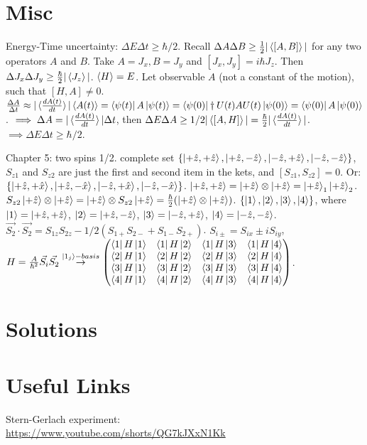 \documentclass{article}
\begin{document}
\section{Misc}
Energy-Time uncertainty:
$\Delta E \Delta t \geq \hbar/2$. Recall $\Delta A \Delta B \geq \frac{1}{2}|\braket{[A,B]}|$ for any two operators $A$ and $B$. Take $A = J_x, B = J_y$ and $[J_x,J_y] = i\hbar J_z$. Then $\Delta J_x \Delta J_y \ge \frac{\hbar}{2}|\braket{J_z}|$. $\braket{H} = E$. Let observable $A$ (not a constant of the motion), such that $[H,A] \neq 0$.
$\frac{\Delta A}{\Delta t} \approx |\braket{\frac{dA(t)}{dt}}|\braket{A(t)} = \bra{\psi(t)}A\ket{\psi(t)} = \bra{\psi(0)}\dagger{U(t)}AU(t)\ket{\psi(0)} = \bra{\psi(0)}A\ket{\psi(0)}$. $\implies \Delta A = |\braket{\frac{dA(t)}{dt}}|\Delta t$, then $\Delta E \Delta A \geq 1/2 |\braket{[A,H]}| = \frac{\hbar}{2}|\braket{\frac{dA(t)}{dt}}|$. $\implies \Delta E \Delta t \geq \hbar/2$.

Chapter 5: two spins 1/2.
complete set $\{\ket{+\hat{z},+\hat{z}}, \ket{+\hat{z},-\hat{z}}, \ket{-\hat{z},+\hat{z}}, \ket{-\hat{z},-\hat{z}}\}$, $S_{z1}$ and $S_{z2}$ are just the first and second item in the kets, and $[S_{z1}, S_{z2}] = 0$. Or: $\{\ket{+\hat{z},+\hat{x}}, \ket{+\hat{z},-\hat{x}}, \ket{-\hat{z},+\hat{x}}, \ket{-\hat{z},-\hat{x}}\}$.
$\ket{+\hat{z},+\hat{z}} = \ket{+\hat{z}} \otimes \ket{+\hat{z}}= \ket{+\hat{z}}_1\ket{+\hat{z}}_2$. $S_{z2}\ket{+\hat{z}} \otimes \ket{+\hat{z}} = \ket{+\hat{z}} \otimes S_{z2}\ket{+\hat{z}} = \frac{\hbar}{2}(\ket{+\hat{z}} \otimes \ket{+\hat{z}})$. $\{\ket{1},\ket{2},\ket{3},\ket{4}\}$, where $\ket{1} = \ket{+\hat{z},+\hat{z}}$, $\ket{2} = \ket{+\hat{z},-\hat{z}}$, $\ket{3} = \ket{-\hat{z},+\hat{z}}$, $\ket{4} = \ket{-\hat{z},-\hat{z}}$. $\vec{S_2}\cdot\vec{S_2} = S_{1z}S_{2z} - 1/2 (S_{1+}S_{2-} + S_{1-}S_{2+})$. $S_{i\pm} = S_{ix} \pm iS_{iy}$, $H = \frac{A}{\hbar^2}\vec{S_i}\vec{S_2} \overset{\ket{1_j}-basis}{\to}\begin{pmatrix}
    \bra{1}H\ket{1} & \bra{1}H\ket{2} & \bra{1}H\ket{3} & \bra{1}H\ket{4}\\
    \bra{2}H\ket{1} & \bra{2}H\ket{2} & \bra{2}H\ket{3} & \bra{2}H\ket{4}\\
    \bra{3}H\ket{1} & \bra{3}H\ket{2} & \bra{3}H\ket{3} & \bra{3}H\ket{4}\\
    \bra{4}H\ket{1} & \bra{4}H\ket{2} & \bra{4}H\ket{3} & \bra{4}H\ket{4}
\end{pmatrix}$.
\newpage
\appendix
\section{Solutions}


\section{Useful Links}
\noindent Stern-Gerlach experiment:\\ \url{https://www.youtube.com/shorts/QG7kJXxN1Kk}
\end{document}
